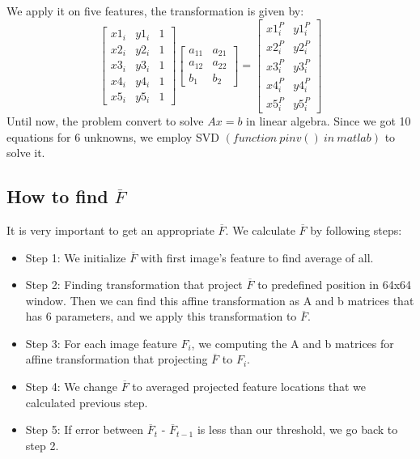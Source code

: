 \documentclass[]{article}
\begin{document}
We apply it on five features, the transformation is given by:
\begin{equation*}
 \begin{bmatrix} x1_{i} & y1_{i} & 1\\ x2_{i} & y2_{i} & 1\\ x3_{i} & y3_{i} & 1\\ x4_{i} & y4_{i} & 1\\ x5_{i} & y5_{i} & 1\end{bmatrix} 
 \begin{bmatrix} a_{11} & a_{21}\\ a_{12} & a_{22}\\ b_{1} & b_{2}\end{bmatrix} =  \begin{bmatrix} x1_{i}^{P} & y1_{i}^{P} \\ x2_{i}^{P} & y2_{i}^{P}\\ x3_{i}^{P} & y3_{i}^{P}\\ x4_{i}^{P} & y4_{i}^{P}\\ x5_{i}^{P} & y5_{i}^{P}\end{bmatrix} 
\end{equation*}
Until now, the problem convert to solve $ Ax=b $ in linear algebra. Since we got 10 equations for 6 unknowns, we employ SVD $( function \ pinv() \ in \ matlab )$ to solve it.

\subsection*{How to find $ \overline{F} $}
It is very important to get an appropriate $ \overline{F} $. We calculate $ \overline{F} $ by following steps:
\begin{itemize}
\item Step 1: We initialize $ \overline{F} $ with first image's feature to find average of all.
\item Step 2: Finding transformation that project $ \overline{F} $  to predefined position in 64x64 window. Then we can find this affine transformation as A and b matrices that has 6 parameters, and we apply this transformation to $ \overline{F} $.
\item Step 3: For each image feature $F_{i}$, we computing the A and b matrices for affine transformation that projecting  $ \overline{F} $ to $F_{i}$. 
\item Step 4: We change $ \overline{F} $ to averaged projected feature locations that we calculated previous step.
\item Step 5: If error between $ \overline{F}_{t} $ - $ \overline{F}_{t-1} $ is less than our threshold, we go back to step 2.
\end{itemize}
\end{document}
